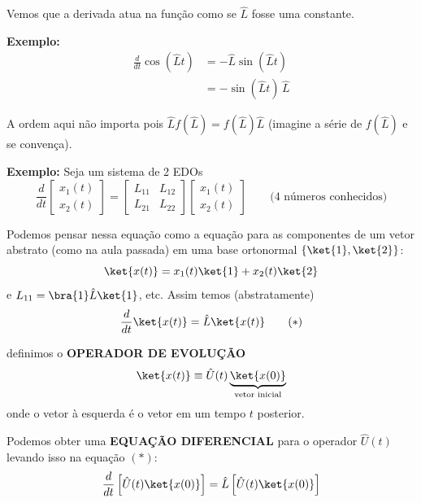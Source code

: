 Vemos que a derivada atua na função como se $\hat{L}$ fosse uma constante.

\textbf{Exemplo:}
\begin{align}
    \frac{d}{dt}\cos(\hat{L}t) &= -\hat{L}\sin(\hat{L}t) \\
    &= -\sin(\hat{L}t)\,\hat{L}
\end{align}

A ordem aqui não importa pois $\hat{L} f(\hat{L}) = f(\hat{L})\hat{L}$ (imagine a série de $f(\hat{L})$ e se convença).

\textbf{Exemplo:} Seja um sistema de 2 EDOs
\begin{equation}
    \frac{d}{dt}
    \begin{bmatrix}
        x_1(t) \\ x_2(t)
    \end{bmatrix}
    =
    \begin{bmatrix}
        L_{11} & L_{12} \\
        L_{21} & L_{22}
    \end{bmatrix}
    \begin{bmatrix}
        x_1(t) \\ x_2(t)
    \end{bmatrix}
    \qquad \text{(4 números conhecidos)}
\end{equation}

Podemos pensar nessa equação como a equação para as componentes de um vetor abstrato (como na aula passada) em uma base ortonormal $\{\ket{1}, \ket{2}\}$:
\begin{equation}
    \ket{x(t)} = x_1(t)\ket{1} + x_2(t)\ket{2}
\end{equation}
e $L_{11} = \bra{1}\hat{L}\ket{1}$, etc. Assim temos (abstratamente)
\begin{equation}
    \label{eq:aula6_eq_evolucao}
    \frac{d}{dt}\ket{x(t)} = \hat{L}\ket{x(t)} \tag{$*$}
\end{equation}

definimos o \textbf{OPERADOR DE EVOLUÇÃO}
\begin{equation}
    \ket{x(t)} \equiv \hat{U}(t)\underbrace{\ket{x(0)}}_{\text{vetor inicial}}
\end{equation}
onde o vetor à esquerda é o vetor em um tempo $t$ posterior.

Podemos obter uma \textbf{EQUAÇÃO DIFERENCIAL} para o operador $\hat{U}(t)$ levando isso na equação $(*)$:
\begin{equation}
    \frac{d}{dt}\left[\hat{U}(t)\ket{x(0)}\right] = \hat{L}\left[\hat{U}(t)\ket{x(0)}\right]
\end{equation}

